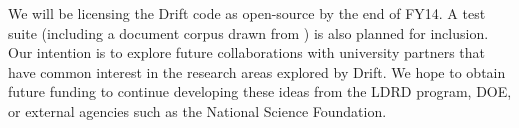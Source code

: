 \begin{itemize}
\end{itemize}

We will be licensing the Drift code as open-source by the end of FY14.  A test suite (including a
document corpus drawn from \cite{govdocs1}) is also planned for inclusion.  Our intention is to explore
future collaborations with university partners that have common interest in the research areas explored
by Drift.  We hope to obtain future funding to continue developing these ideas from the LDRD program,
DOE, or external agencies such as the National Science Foundation.  






